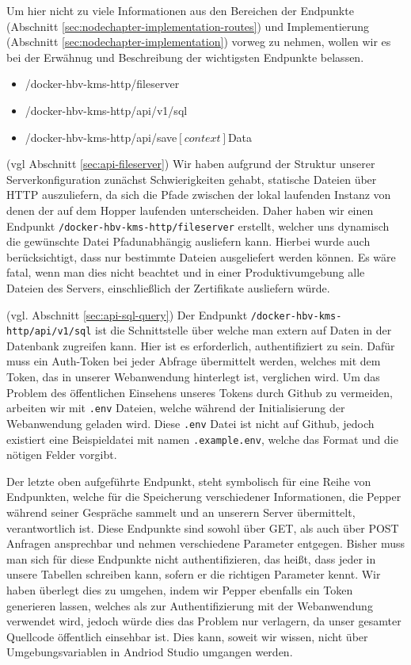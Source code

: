 Um hier nicht zu viele Informationen aus den Bereichen der Endpunkte (Abschnitt \ref{sec:nodechapter-implementation-routes}) und Implementierung (Abschnitt \ref{sec:nodechapter-implementation}) vorweg zu nehmen, wollen wir es bei der Erwähnug und Beschreibung der wichtigsten Endpunkte belassen.

\begin{itemize}
    \item /docker-hbv-kms-http/fileserver
    \item /docker-hbv-kms-http/api/v1/sql
    \item /docker-hbv-kms-http/api/save$\left[context\right]$Data
\end{itemize}

(vgl Abschnitt \ref{sec:api-fileserver}) Wir haben aufgrund der Struktur unserer Serverkonfiguration zunächst Schwierigkeiten gehabt, statische Dateien über HTTP auszuliefern, da sich die Pfade zwischen der lokal laufenden Instanz von denen der auf dem Hopper laufenden unterscheiden. Daher haben wir einen Endpunkt \verb|/docker-hbv-kms-http/fileserver| erstellt, welcher uns dynamisch die gewünschte Datei Pfadunabhängig ausliefern kann. Hierbei wurde auch berücksichtigt, dass nur bestimmte Dateien ausgeliefert werden können. Es wäre fatal, wenn man dies nicht beachtet und in einer Produktivumgebung alle Dateien des Servers, einschließlich der Zertifikate ausliefern würde.

(vgl. Abschnitt \ref{sec:api-sql-query}) Der Endpunkt \verb|/docker-hbv-kms-http/api/v1/sql| ist die Schnittstelle über welche man extern auf Daten in der
Datenbank zugreifen kann. Hier ist es erforderlich, authentifiziert zu sein.
Dafür muss ein Auth-Token bei jeder Abfrage übermittelt werden, welches mit dem Token, das in unserer Webanwendung hinterlegt ist, verglichen wird. Um das Problem des öffentlichen Einsehens unseres Tokens durch Github zu vermeiden, arbeiten wir mit \verb|.env| Dateien, welche während der Initialisierung der Webanwendung geladen wird. Diese \verb|.env| Datei ist nicht auf Github, jedoch existiert eine Beispieldatei mit namen \verb|.example.env|, welche das Format und die
nötigen Felder vorgibt.

Der letzte oben aufgeführte Endpunkt, steht symbolisch für eine Reihe von Endpunkten, welche für die Speicherung verschiedener Informationen, die Pepper während seiner Gespräche sammelt und an unserern Server übermittelt, verantwortlich ist. Diese Endpunkte sind sowohl über GET, als auch über POST Anfragen ansprechbar und nehmen verschiedene Parameter entgegen. Bisher muss man sich für diese Endpunkte nicht authentifizieren, das heißt, dass jeder in unsere Tabellen schreiben kann, sofern er die richtigen Parameter kennt. Wir haben überlegt dies zu umgehen, indem wir Pepper ebenfalls ein Token generieren lassen, welches als zur Authentifizierung mit der Webanwendung verwendet wird, jedoch würde dies das Problem nur verlagern, da unser gesamter Quellcode öffentlich einsehbar ist. Dies kann, soweit wir wissen, nicht über Umgebungsvariablen in Andriod Studio umgangen werden.

